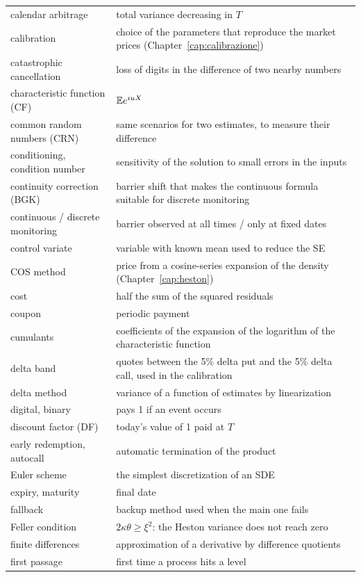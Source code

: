 \begin{small}
\begin{longtable}{@{}>{\raggedright\arraybackslash}p{}%
  >{\raggedright\arraybackslash}p{}@{}}
calendar arbitrage & total variance decreasing in $T$\\
calibration & choice of the parameters that reproduce the market prices (Chapter~\ref{cap:calibrazione})\\
catastrophic cancellation & loss of digits in the difference of two nearby numbers\\
characteristic function (CF) & $\mathbb{E} e^{iuX}$\\
common random numbers (CRN) & same scenarios for two estimates, to measure their difference\\
conditioning, condition number & sensitivity of the solution to small errors in the inputs\\
continuity correction (BGK) & barrier shift that makes the continuous formula suitable for discrete monitoring\\
continuous / discrete monitoring & barrier observed at all times / only at fixed dates\\
control variate & variable with known mean used to reduce the SE\\
COS method & price from a cosine-series expansion of the density (Chapter~\ref{cap:heston})\\
cost & half the sum of the squared residuals\\
coupon & periodic payment\\
cumulants & coefficients of the expansion of the logarithm of the characteristic function\\
delta band & quotes between the 5\% delta put and the 5\% delta call, used in the calibration\\
delta method & variance of a function of estimates by linearization\\
digital, binary & pays 1 if an event occurs\\
discount factor (DF) & today's value of 1 paid at $T$\\
early redemption, autocall & automatic termination of the product\\
Euler scheme & the simplest discretization of an SDE\\
expiry, maturity & final date\\
fallback & backup method used when the main one fails\\
Feller condition & $2\kappa\theta\ge\xi^2$: the Heston variance does not reach zero\\
finite differences & approximation of a derivative by difference quotients\\
first passage & first time a process hits a level\\

\end{longtable}
\end{small}

